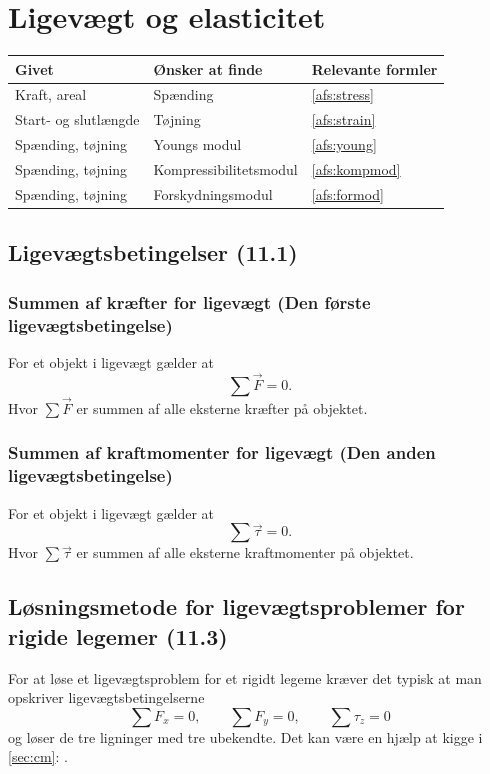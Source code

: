\section{Ligevægt og elasticitet}

\begin{table}[ht]
\begin{tabular}{|l|l|l|}
\hline
\textbf{Givet}       & \textbf{Ønsker at finde} & \textbf{Relevante formler} \\ \hline
Kraft, areal         & Spænding                 & \ref{afs:stress}           \\ \hline
Start- og slutlængde & Tøjning                  & \ref{afs:strain}           \\ \hline
Spænding, tøjning    & Youngs modul             & \ref{afs:young}            \\ \hline
Spænding, tøjning    & Kompressibilitetsmodul   & \ref{afs:kompmod}          \\ \hline
Spænding, tøjning    & Forskydningsmodul        & \ref{afs:formod}           \\ \hline
\end{tabular}
\end{table}

\subsection{Ligevægtsbetingelser (11.1)}

\subsubsection{Summen af kræfter for ligevægt (Den første ligevægtsbetingelse)}
For et objekt i ligevægt gælder at
\[ 
\sum \Vec{F} = 0
.\]
Hvor $\sum \Vec{F}$ er summen af alle eksterne kræfter på objektet.

\subsubsection{Summen af kraftmomenter for ligevægt (Den anden ligevægtsbetingelse)}
For et objekt i ligevægt gælder at
\[ 
\sum \Vec{\tau} = 0
.\]
Hvor $\sum \Vec{\tau}$ er summen af alle eksterne kraftmomenter på objektet.


\subsection{Løsningsmetode for ligevægtsproblemer for rigide legemer (11.3)}
For at løse et ligevægtsproblem for et rigidt legeme kræver det typisk at man opskriver ligevægtsbetingelserne
\[ 
\sum F_x = 0, \qquad \sum F_y = 0, \qquad \sum \tau_z = 0
\]
og løser de tre ligninger med tre ubekendte. Det kan være en hjælp at kigge i \ref{sec:cm}: .



